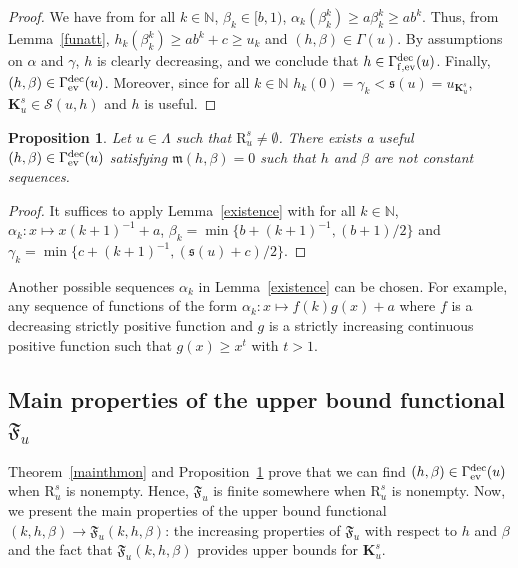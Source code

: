 \documentclass{article}
\def\valu#1{\mathfrak{s}(#1)}
\def\funset{\Gamma}
\def\fmong{\funset_{{\rm ev}}^{\rm dec}}
\def\fmonfung{{\funset}_{\rm f,{\rm ev}}^{\rm dec}}
\def\mon{\mathfrak{m}}
\def\Fu{\mathfrak{F}_u}
\def\nn{\mathbb N}
\def\bigks{\mathbf{K}^s}
\def\gls#1{{\mathrm R}_{#1}}
\def\gsls#1{\gls{#1}^s}
\def\res{\mathcal{S}}
\newtheorem{prop}{Proposition}
\def\red#1{#1}
\def\blue#1{#1}
\begin{document}
	\begin{proof}
		We have from for all $k\in\nn$, $\beta_k\in [b,1)$, $\alpha_k(\beta_k^k)\geq a\beta_k^k\geq a b^k$. Thus, from Lemma~\ref{funatt}, 
		$h_k(\beta_k^k)\geq ab^k+c\geq u_k$ and $(h,\beta)\in\funset(u)$. By assumptions on $\alpha$ and $\gamma$, $h$ is clearly decreasing, and we conclude that $h\in\fmonfung(u)$. Finally, $(h,\beta)\in\fmong(u)$. Moreover, since for all $k\in\nn$ $h_k(0)=\gamma_k<\valu{u}=u_{\bigks_u}$, $\bigks_u\in\res(u,h)$ and $h$ is useful.
	\end{proof} 
	
	\begin{prop}
		\label{monfun}
		Let $u\in\Lambda$ such that $\gsls{u}\neq \emptyset$. There exists \blue{a useful $(h,\beta)\in\fmong(u)$ satisfying $\mon(h,\beta)=0$ such that} $h$ and $\beta$ are not constant sequences.
	\end{prop}
	\begin{proof}
		It suffices to apply Lemma~\ref{existence} with for all $k\in\nn$, $\alpha_k:x\mapsto x(k+1)^{-1}+a$, $\beta_k=\min\{b+(k+1)^{-1},(b+1)/2\}$ and  $\gamma_k=\min\{c+(k+1)^{-1},(\valu{u}+c)/2\}$.
	\end{proof}
	\blue{Another} possible sequences $\alpha_k$ in Lemma~\ref{existence} can be chosen. \red{For example}, any sequence of functions of the form $\alpha_k:x\mapsto f(k)g(x)+a$ where $f$ is a decreasing strictly positive function and $g$ is a strictly increasing continuous positive function such that $g(x)\geq x^t$ with $t>1$.
	
	\subsection{Main properties of the upper \red{bound functional} $\Fu$}
	\label{mainpropsec}
	Theorem~\ref{mainthmon} and Proposition~\ref{monfun} prove that we can find $(h,\beta)\in\fmong(u)$ when $\gsls{u}$ is nonempty. Hence, $\Fu$ is finite somewhere when $\gsls{u}$ is nonempty. Now, we present the main properties of the upper bound functional $(k,h,\beta)\to\Fu(k,h,\beta)$: the increasing properties of $\Fu$ with respect to $h$ and $\beta$ and the fact that $\Fu(k,h,\beta)$ provides upper bounds for $\bigks_u$.  
	
\end{document}
